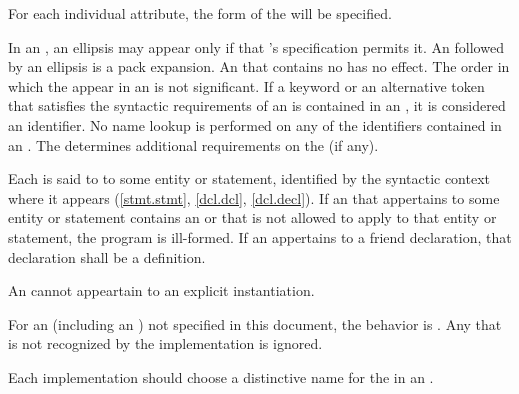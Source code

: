 \pnum
\begin{note}
For each individual attribute, the form of the
 will be specified.
\end{note}

\pnum
In an , an ellipsis may appear only if that
's specification permits it. An  followed
by an ellipsis is a pack expansion.
An  that contains no  has no
effect. The order in which the  appear in an
 is not significant. If a
keyword
or an alternative token that satisfies the syntactic requirements
of an  is
contained in
an , it is considered an identifier. No name
lookup is performed on any of the identifiers contained in an
. The  determines additional
requirements on the  (if any).

\pnum
Each  is said to  to some entity or
statement, identified by the syntactic context where it appears
(\ref{stmt.stmt}, \ref{dcl.dcl},
\ref{dcl.decl}). If an  that appertains to some
entity or statement contains an  or  that
is not allowed to apply to that
entity or statement, the program is ill-formed. If an 
appertains to a friend declaration, that declaration shall be a
definition.
\begin{note}
An  cannot appeartain to
an explicit instantiation.
\end{note}

\pnum
For an 
(including an )
not specified in this document, the
behavior is .
Any  that is not recognized by the implementation
is ignored.
\begin{note}
Each implementation should choose a distinctive name for the
 in an .
\end{note}

